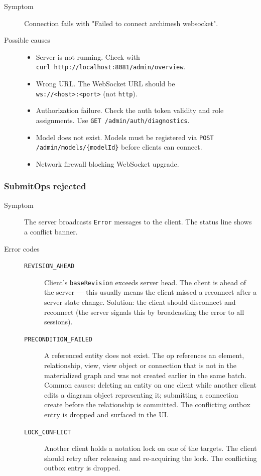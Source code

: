 \begin{description}
\item[Symptom] Connection fails with "Failed to connect archimesh websocket".
\item[Possible causes]
  \begin{itemize}
  \item Server is not running. Check with \\
    \texttt{curl http://localhost:8081/admin/overview}.
  \item Wrong URL. The WebSocket URL should be \\
    \texttt{ws://<host>:<port>} (not \texttt{http}).
  \item Authorization failure. Check the auth token validity and role
    assignments. Use \texttt{GET /admin/auth/diagnostics}.
  \item Model does not exist. Models must be registered via
    \texttt{POST /admin/models/\{modelId\}} before clients can connect.
  \item Network firewall blocking WebSocket upgrade.
  \end{itemize}
\end{description}

\subsubsection{SubmitOps rejected}

\begin{description}
\item[Symptom] The server broadcasts \texttt{Error} messages to the client.
  The status line shows a conflict banner.
\item[Error codes]
  \begin{description}
  \item[\texttt{REVISION\_AHEAD}] Client's \texttt{baseRevision} exceeds
    server head. The client is ahead of the server --- this usually means
    the client missed a reconnect after a server state change. Solution: the
    client should disconnect and reconnect (the server signals this by
    broadcasting the error to all sessions).
  \item[\texttt{PRECONDITION\_FAILED}] A referenced entity does not exist.
    The op references an element, relationship, view, view object or
    connection that is not in the materialized graph and was not created
    earlier in the same batch. Common causes: deleting an entity on one
    client while another client edits a diagram object representing it;
    submitting a connection create before the relationship is committed.
    The conflicting outbox entry is dropped and surfaced in the UI.
  \item[\texttt{LOCK\_CONFLICT}] Another client holds a notation lock on
    one of the targets. The client should retry after releasing and
    re-acquiring the lock. The conflicting outbox entry is dropped.
  \end{description}
\end{description}

